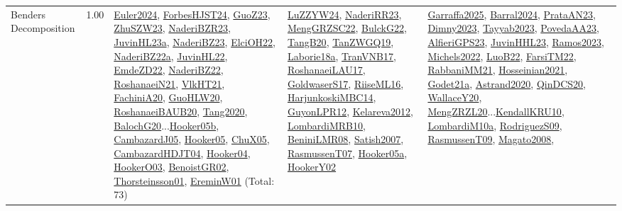 {\begin{longtable}{p{3cm}r>{\raggedright\arraybackslash}p{6cm}>{\raggedright\arraybackslash}p{6cm}>{\raggedright\arraybackslash}p{8cm}}
\index{Benders Decomposition}\index{Concepts!Benders Decomposition}Benders Decomposition &  1.00 & \hyperref[detail:Euler2024]{Euler2024}, \hyperref[detail:ForbesHJST24]{ForbesHJST24}, \hyperref[detail:GuoZ23]{GuoZ23}, \hyperref[detail:ZhuSZW23]{ZhuSZW23}, \hyperref[detail:NaderiBZR23]{NaderiBZR23}, \hyperref[detail:JuvinHL23a]{JuvinHL23a}, \hyperref[detail:NaderiBZ23]{NaderiBZ23}, \hyperref[detail:ElciOH22]{ElciOH22}, \hyperref[detail:NaderiBZ22a]{NaderiBZ22a}, \hyperref[detail:JuvinHL22]{JuvinHL22}, \hyperref[detail:EmdeZD22]{EmdeZD22}, \hyperref[detail:NaderiBZ22]{NaderiBZ22}, \hyperref[detail:RoshanaeiN21]{RoshanaeiN21}, \hyperref[detail:VlkHT21]{VlkHT21}, \hyperref[detail:FachiniA20]{FachiniA20}, \hyperref[detail:GuoHLW20]{GuoHLW20}, \hyperref[detail:RoshanaeiBAUB20]{RoshanaeiBAUB20}, \hyperref[detail:Tang2020]{Tang2020}, \hyperref[detail:BalochG20]{BalochG20}...\hyperref[detail:Hooker05b]{Hooker05b}, \hyperref[detail:CambazardJ05]{CambazardJ05}, \hyperref[detail:Hooker05]{Hooker05}, \hyperref[detail:ChuX05]{ChuX05}, \hyperref[detail:CambazardHDJT04]{CambazardHDJT04}, \hyperref[detail:Hooker04]{Hooker04}, \hyperref[detail:HookerO03]{HookerO03}, \hyperref[detail:BenoistGR02]{BenoistGR02}, \hyperref[detail:Thorsteinsson01]{Thorsteinsson01}, \hyperref[detail:EreminW01]{EreminW01} (Total: 73) & \hyperref[detail:LuZZYW24]{LuZZYW24}, \hyperref[detail:NaderiRR23]{NaderiRR23}, \hyperref[detail:MengGRZSC22]{MengGRZSC22}, \hyperref[detail:BulckG22]{BulckG22}, \hyperref[detail:TangB20]{TangB20}, \hyperref[detail:TanZWGQ19]{TanZWGQ19}, \hyperref[detail:Laborie18a]{Laborie18a}, \hyperref[detail:TranVNB17]{TranVNB17}, \hyperref[detail:RoshanaeiLAU17]{RoshanaeiLAU17}, \hyperref[detail:GoldwaserS17]{GoldwaserS17}, \hyperref[detail:RiiseML16]{RiiseML16}, \hyperref[detail:HarjunkoskiMBC14]{HarjunkoskiMBC14}, \hyperref[detail:GuyonLPR12]{GuyonLPR12}, \hyperref[detail:Kelareva2012]{Kelareva2012}, \hyperref[detail:LombardiMRB10]{LombardiMRB10}, \hyperref[detail:BeniniLMR08]{BeniniLMR08}, \hyperref[detail:Satish2007]{Satish2007}, \hyperref[detail:RasmussenT07]{RasmussenT07}, \hyperref[detail:Hooker05a]{Hooker05a}, \hyperref[detail:HookerY02]{HookerY02} & \hyperref[detail:Garraffa2025]{Garraffa2025}, \hyperref[detail:Barral2024]{Barral2024}, \hyperref[detail:PrataAN23]{PrataAN23}, \hyperref[detail:Dimny2023]{Dimny2023}, \hyperref[detail:Tayyab2023]{Tayyab2023}, \hyperref[detail:PovedaAA23]{PovedaAA23}, \hyperref[detail:AlfieriGPS23]{AlfieriGPS23}, \hyperref[detail:JuvinHHL23]{JuvinHHL23}, \hyperref[detail:Ramos2023]{Ramos2023}, \hyperref[detail:Michels2022]{Michels2022}, \hyperref[detail:LuoB22]{LuoB22}, \hyperref[detail:FarsiTM22]{FarsiTM22}, \hyperref[detail:RabbaniMM21]{RabbaniMM21}, \hyperref[detail:Hosseinian2021]{Hosseinian2021}, \hyperref[detail:Godet21a]{Godet21a}, \hyperref[detail:Astrand2020]{Astrand2020}, \hyperref[detail:QinDCS20]{QinDCS20}, \hyperref[detail:WallaceY20]{WallaceY20}, \hyperref[detail:MengZRZL20]{MengZRZL20}...\hyperref[detail:KendallKRU10]{KendallKRU10}, \hyperref[detail:LombardiM10a]{LombardiM10a}, \hyperref[detail:RodriguezS09]{RodriguezS09}, \hyperref[detail:RasmussenT09]{RasmussenT09}, \hyperref[detail:Magato2008]{Magato2008}, 
\end{longtable}}
